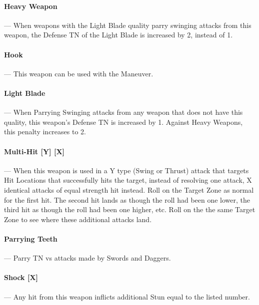 \documentclass[oneside,11pt,english]{book}
\begin{document}
\vspace{-5pt}\paragraph{\label{wepqual:Heavy Weapon}Heavy Weapon}---\quad
When weapons with the Light Blade quality parry swinging attacks from this weapon, the Defense TN of the Light Blade is increased by 2, instead of 1.

\vspace{-5pt}\paragraph{\label{wepqual:Hook}Hook}---\quad
This weapon can be used with the  Maneuver.

\vspace{-5pt}\paragraph{\label{wepqual:Light Blade}Light Blade}---\quad
When Parrying Swinging attacks from any weapon that does not have this quality, this weapon’s Defense TN is increased by 1. Against Heavy Weapons, this penalty increases to 2.

\vspace{-5pt}\paragraph[Multi-Hit]{\label{wepqual:Multi-Hit}Multi-Hit [Y] [X]}---\quad
When this weapon is used in a Y type (Swing or Thrust) attack that targets Hit Locations that successfully hits the target, instead of resolving one attack, X identical attacks of equal strength hit instead. Roll on the Target Zone as normal for the first hit. The second hit lands as though the roll had been one lower, the third hit as though the roll had been one higher, etc. Roll on the the same Target Zone to see where these additional attacks land.

\vspace{-5pt}\paragraph{\label{wepqual:Parrying Teeth}Parrying Teeth}--- Parry TN vs attacks made by Swords and Daggers.

\vspace{-5pt}\paragraph[Shock]{\label{wepqual:Shock}Shock [X]}---\quad
Any hit from this weapon inflicts additional Stun equal to the listed number.
\end{document}
